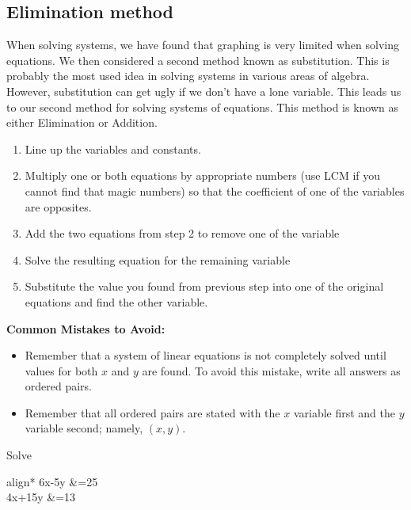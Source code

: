 \subsection{Elimination method}
When solving systems, we have found that graphing is very limited when solving equations. We then considered a second method known as substitution. This is probably the most used idea in solving systems in various areas of algebra. However, substitution can get ugly if we don’t have a lone variable. This leads us to our second method for solving systems of equations. This method is known as either Elimination or Addition.
\begin{tcolorbox}[title=Elimination Method, fonttitle=\bfseries,
	                  colframe=blue!70!black,
	                  colback=white]
\begin{enumerate}
    \item	Line up the variables and constants.
    \item	Multiply one or both equations by appropriate numbers (use 
            LCM if you cannot find that magic numbers) so that the coefficient of one of the variables are opposites.
    \item	Add the two equations from step 2 to remove one of the 
            variable
    \item 	Solve the resulting equation for the remaining variable
    \item 	Substitute the value you found from previous step into one
            of the original equations and find the other variable.
\end{enumerate}
\end{tcolorbox}
%
\textbf{Common Mistakes to Avoid:}
\begin{itemize}
    \item	Remember that a system of linear equations is not completely         solved until values for both $x$ and $y$ are found. To avoid         this mistake, write all answers as ordered pairs. 
    \item	Remember that all ordered pairs are stated with the
            $x$ variable first and the $y$ variable second; namely, $(x, y)$.
\end{itemize}
\begin{example}
Solve 
		\begin{empheq}[left={\empheqlbrace}]{align*}
				6x-5y &=25\\
				4x+15y &=13	
		\end{empheq}
\end{example}
